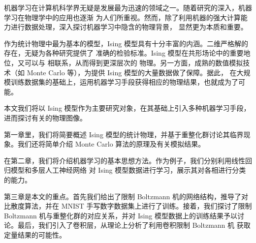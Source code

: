 机器学习在计算机科学界无疑是发展最为迅速的领域之一。随着研究的深入，机器学习在物理学中的应用也逐渐
为人们所重视。然而，除了利用机器的强大计算能力进行数据处理，深入探讨机器学习中隐含的物理背景，
显然更为本质和重要。

作为统计物理中最为基本的模型，Ising 模型具有十分丰富的内涵。二维严格解的存在，无疑为各种研究提供了
准确的检验标准。Ising 模型在共形场论中的重要地位，又可以与 \AdSCFT{} 相联系，从而得到更深层次的
物理。另一方面，成熟的数值模拟技术（如 Monte Carlo 等），为提供 Ising 模型的大量数据做了保障。据此，
在大规模训练数据集的基础上，运用机器学习手段获得相应的物理结果，也就成为了可能。

本文我们将以 Ising 模型作为主要研究对象，在其基础上引入多种机器学习手段，进而探讨有关的物理图像。

第一章里，我们将简要概述 Ising 模型的统计物理，并基于重整化群讨论其临界现象。我们还将简单介绍
Monte Carlo 算法的原理及有关模拟结果。

在第二章，我们将介绍机器学习的基本思想方法。作为例子，我们分别利用线性回归模型和多层人工神经网络
对 Ising 模型数据进行学习，展示其对各相进行分类的能力。

第三章是本文的重点。首先我们给出了限制 Boltzmann 机的网络结构，推导了对比散度算法，并在 MNIST
手写数字数据集上进行了训练。接着，我们探讨了限制 Boltzmann 机与重整化群的对应关系，并对 Ising
模型数据上的训练结果予以讨论。最后，我们引入了卷积层，从理论上分析了利用卷积限制 Boltzmann 机
获取定量结果的可能性。
